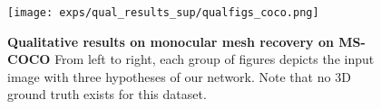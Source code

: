 \begin{figure}[t]
\centering
{\texttt{[image: exps/qual\_results\_sup/qualfigs\_coco.png]}}
\vspace{-1cm}
\caption{%
    \textbf{Qualitative results on monocular mesh recovery on MS-COCO} 
    From left to right, each group of figures depicts the input image with three hypotheses of our network. Note that no 3D ground truth exists for this dataset.
    }\label{fig:h36m_qual_coco}
\end{figure}